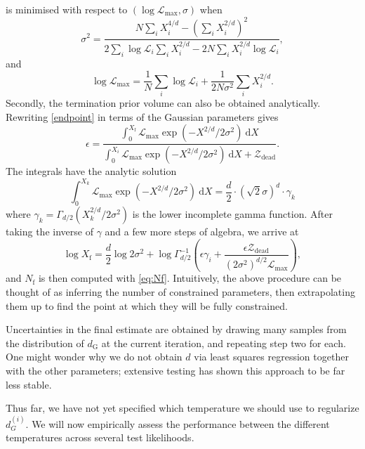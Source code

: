 \documentclass[usenatbib]{mnras}
\newcommand{\Like}{\mathcal{L}}
\newcommand{\logLmax}{\log \Like_\mathrm{max}}
\newcommand{\dG}{d_\mathrm{G}}
\begin{document}
is minimised with respect to $(\logLmax, \sigma)$ when
\begin{equation}\label{eq:sigma}
    \sigma^2 = \frac{N \sum_i X_i^{4/d} - \left(\sum_i X_i^{2/d}\right)^2}{2 \sum_i \log \Like_i \sum_i X_i^{2/d} - 2N \sum_i X_i^{2/d}\log \Like_i },
\end{equation}
and
\begin{equation}\label{eq:logLmax}
    \logLmax = \frac{1}{N} \sum_i \log \mathcal{L}_i + \frac{1}{2N\sigma^2} \sum_i X_i^{2/d}.
\end{equation}
Secondly, the termination prior volume can also be obtained analytically. Rewriting \cref{endpoint} in terms of the Gaussian parameters gives
\begin{equation}
	\epsilon = \frac{\int_0^{X_\mathrm{f}} \Like_\mathrm{max} \exp\left(-X^{2/d}/2\sigma^2\right)\ \mathrm{d}X}{\int_0^{X_i} \Like_\mathrm{max} \exp\left(-X^{2/d}/2\sigma^2\right)\ \mathrm{d}X + \mathcal{Z}_\mathrm{dead}}.
\end{equation}
The integrals have the analytic solution
\begin{equation}
	\int_0^{X_k} \Like_\mathrm{max} \exp\left(-X^{2/d}/2\sigma^2\right)\ \mathrm{d}X = \frac{d}{2} \cdot \left(\sqrt{2}\sigma\right)^d \cdot \gamma_k
\end{equation}
where $\gamma_k = \Gamma_{d/2}\left(X_k^{2/d}/2\sigma^2\right)$ is the lower incomplete gamma function. After taking the inverse of  $\gamma$ and a few more steps of algebra, we arrive at
\begin{equation}
    \log X_\mathrm{f} = \frac{d}{2}\log 2\sigma^2	+ \log \Gamma^{-1}_{d/2} \left(\epsilon \gamma_i+ \frac{\epsilon\mathcal{Z}_\mathrm{dead}}{ \left( 2\sigma^2 \right)^{d/2}\Like_\mathrm{max}}\right),\label{eq:xf}
\end{equation}
and $N_\mathrm{f}$ is then computed with \cref{eq:Nf}. Intuitively, the above procedure can be thought of as inferring the number of constrained parameters, then extrapolating them up to find the point at which they will be fully constrained. 
\par
Uncertainties in the final estimate are obtained by drawing many samples from the distribution of $\dG$ at the current iteration, and repeating step two for each. One might wonder why we do not obtain $d$ via least squares regression together with the other parameters; extensive testing has shown this approach to be far less stable.
\par
Thus far, we have not yet specified which temperature we should use to regularize $d_G^{(i)}$. We will now empirically assess the performance between the different temperatures across several test likelihoods.
\end{document}
